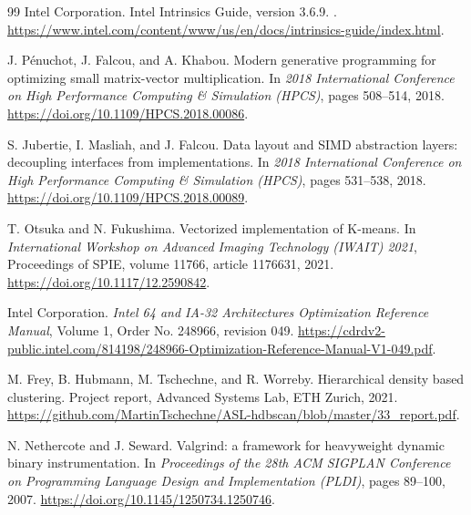\documentclass[11pt,a4paper]{article}
\begin{document}
\begin{thebibliography}{99}
Intel Corporation.
\newblock Intel Intrinsics Guide, version 3.6.9.
.
\newblock \url{https://www.intel.com/content/www/us/en/docs/intrinsics-guide/index.html}.

J. Pénuchot, J. Falcou, and A. Khabou.
\newblock Modern generative programming for optimizing small matrix-vector multiplication.
\newblock In \emph{2018 International Conference on High Performance Computing \& Simulation (HPCS)}, pages 508--514, 2018.
\newblock \url{https://doi.org/10.1109/HPCS.2018.00086}.

S. Jubertie, I. Masliah, and J. Falcou.
\newblock Data layout and SIMD abstraction layers: decoupling interfaces from implementations.
\newblock In \emph{2018 International Conference on High Performance Computing \& Simulation (HPCS)}, pages 531--538, 2018.
\newblock \url{https://doi.org/10.1109/HPCS.2018.00089}.

T. Otsuka and N. Fukushima.
\newblock Vectorized implementation of K-means.
\newblock In \emph{International Workshop on Advanced Imaging Technology (IWAIT) 2021}, Proceedings of SPIE, volume 11766, article 1176631, 2021.
\newblock \url{https://doi.org/10.1117/12.2590842}.

Intel Corporation.
\newblock \emph{Intel 64 and IA-32 Architectures Optimization Reference Manual}, Volume 1, Order No. 248966, revision 049.
\newblock \url{https://cdrdv2-public.intel.com/814198/248966-Optimization-Reference-Manual-V1-049.pdf}.

M. Frey, B. Hubmann, M. Tschechne, and R. Worreby.
\newblock Hierarchical density based clustering.
\newblock Project report, Advanced Systems Lab, ETH Zurich, 2021.
\newblock \url{https://github.com/MartinTschechne/ASL-hdbscan/blob/master/33_report.pdf}.

N. Nethercote and J. Seward.
\newblock Valgrind: a framework for heavyweight dynamic binary
instrumentation.
\newblock In \emph{Proceedings of the 28th ACM SIGPLAN Conference
on Programming Language Design and Implementation (PLDI)}, pages
89--100, 2007.
\newblock \url{https://doi.org/10.1145/1250734.1250746}.

\end{thebibliography}
\end{document}
